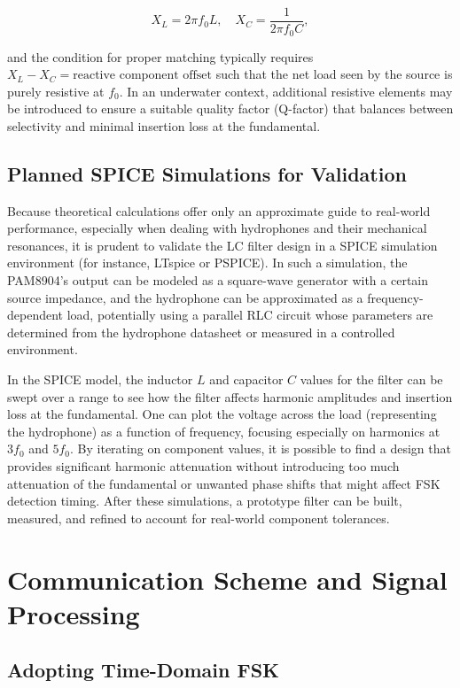 \[
X_L = 2\pi f_0 L, \quad
X_C = \frac{1}{2\pi f_0 C},
\]

and the condition for proper matching typically requires \(X_L - X_C = \text{reactive component offset}\) such that the net load seen by the source is purely resistive at \(f_0\). In an underwater context, additional resistive elements may be introduced to ensure a suitable quality factor (Q-factor) that balances between selectivity and minimal insertion loss at the fundamental. 

\section{Planned SPICE Simulations for Validation}

Because theoretical calculations offer only an approximate guide to real-world performance, especially when dealing with hydrophones and their mechanical resonances, it is prudent to validate the LC filter design in a SPICE simulation environment (for instance, LTspice or PSPICE). In such a simulation, the PAM8904's output can be modeled as a square-wave generator with a certain source impedance, and the hydrophone can be approximated as a frequency-dependent load, potentially using a parallel RLC circuit whose parameters are determined from the hydrophone datasheet or measured in a controlled environment.

In the SPICE model, the inductor \(L\) and capacitor \(C\) values for the filter can be swept over a range to see how the filter affects harmonic amplitudes and insertion loss at the fundamental. One can plot the voltage across the load (representing the hydrophone) as a function of frequency, focusing especially on harmonics at \(3f_0\) and \(5f_0\). By iterating on component values, it is possible to find a design that provides significant harmonic attenuation without introducing too much attenuation of the fundamental or unwanted phase shifts that might affect FSK detection timing. After these simulations, a prototype filter can be built, measured, and refined to account for real-world component tolerances.

\chapter{Communication Scheme and Signal Processing}

\section{Adopting Time-Domain FSK}

